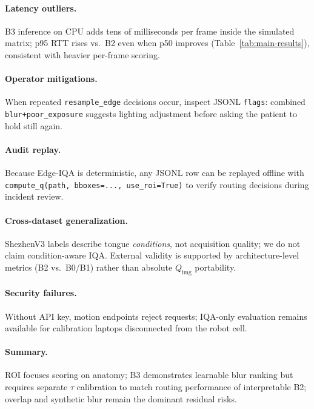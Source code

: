 \paragraph{Latency outliers.}
B3 inference on CPU adds tens of milliseconds per frame inside the simulated matrix; p95 RTT rises vs.\ B2 even when p50 improves (Table~\ref{tab:main-results}), consistent with heavier per-frame scoring.

\paragraph{Operator mitigations.}
When repeated \texttt{resample\_edge} decisions occur, inspect JSONL \texttt{flags}: combined \texttt{blur+poor\_exposure} suggests lighting adjustment before asking the patient to hold still again.

\paragraph{Audit replay.}
Because Edge-IQA is deterministic, any JSONL row can be replayed offline with \texttt{compute\_q(path, bboxes=..., use\_roi=True)} to verify routing decisions during incident review.

\paragraph{Cross-dataset generalization.}
ShezhenV3 labels describe tongue \emph{conditions}, not acquisition quality; we do not claim condition-aware IQA.
External validity is supported by architecture-level metrics (B2 vs.\ B0/B1) rather than absolute $Q_{\mathrm{img}}$ portability.

\paragraph{Security failures.}
Without API key, motion endpoints reject requests; IQA-only evaluation remains available for calibration laptops disconnected from the robot cell.

\paragraph{Summary.}
ROI focuses scoring on anatomy; B3 demonstrates learnable blur ranking but requires separate $\tau$ calibration to match routing performance of interpretable B2; overlap and synthetic blur remain the dominant residual risks.
